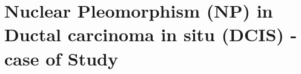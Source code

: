 \documentclass[usenames,dvipsnames]{beamer}
\begin{document}
%
%


\section{Nuclear Pleomorphism (NP) in Ductal carcinoma in situ (DCIS) - case of Study}

\end{document}
